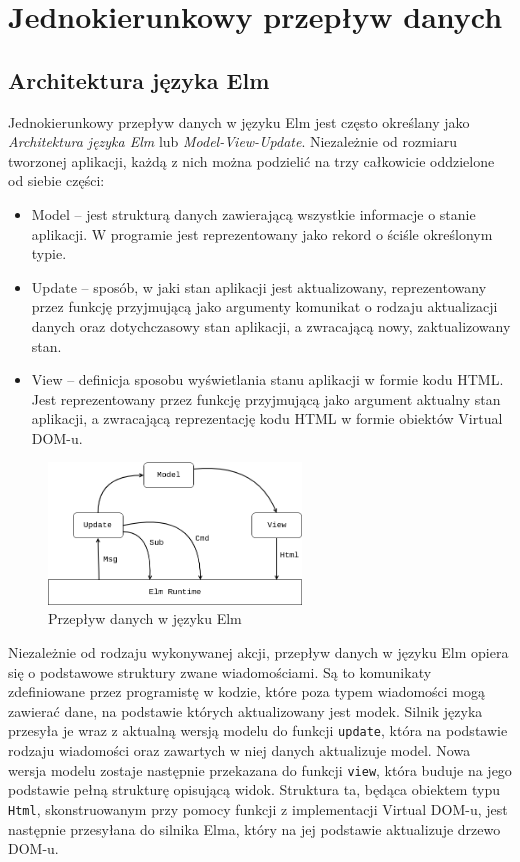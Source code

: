 \section{Jednokierunkowy przepływ danych}
\subsection{Architektura języka Elm}
Jednokierunkowy przepływ danych w języku Elm jest często określany jako \textit{Architektura języka Elm} lub \textit{Model-View-Update}. Niezależnie od rozmiaru tworzonej aplikacji, każdą z nich można podzielić na trzy całkowicie oddzielone od siebie części:
\begin{itemize}
	\item Model -- jest strukturą danych zawierającą wszystkie informacje o stanie aplikacji. W programie jest reprezentowany jako rekord o ściśle określonym typie.
	\item Update -- sposób, w jaki stan aplikacji jest aktualizowany, reprezentowany przez funkcję przyjmującą jako argumenty komunikat o rodzaju aktualizacji danych oraz dotychczasowy stan aplikacji, a zwracającą nowy, zaktualizowany stan.
	\item View -- definicja sposobu wyświetlania stanu aplikacji w formie kodu HTML. Jest reprezentowany przez funkcję przyjmującą jako argument aktualny stan aplikacji, a zwracającą reprezentację kodu HTML w formie obiektów Virtual DOM-u.
\end{itemize}
\begin{figure}[h]
	\centering
	\includegraphics[width=0.6\textwidth]{images/elm_data_flow}
	\caption{Przepływ danych w języku Elm}
	\label{fig:elmFlow}
\end{figure}
\FloatBarrier
Niezależnie od rodzaju wykonywanej akcji, przepływ danych w języku Elm opiera się o podstawowe struktury zwane wiadomościami. Są to komunikaty zdefiniowane przez programistę w kodzie, które poza typem wiadomości mogą zawierać dane, na podstawie których aktualizowany jest modek. Silnik języka przesyła je wraz z aktualną wersją modelu do funkcji \lstinline{update}, która na podstawie rodzaju wiadomości oraz zawartych w niej danych aktualizuje model. Nowa wersja modelu zostaje następnie przekazana do funkcji \lstinline{view}, która buduje na jego podstawie pełną strukturę opisującą widok. Struktura ta, będąca obiektem typu \lstinline[style=elm-style]{Html}, skonstruowanym przy pomocy funkcji z implementacji Virtual DOM-u, jest następnie przesyłana do silnika Elma, który na jej podstawie aktualizuje drzewo DOM-u.

